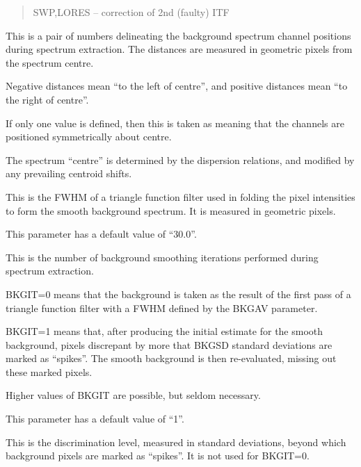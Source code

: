 \begin {description}
\begin {quote}
\begin {description}
\item SWP,LORES -- correction of 2nd (faulty) ITF
\end {description}
\end {quote}

\item [BDIST=(number\{,number\})]
This is a pair of numbers delineating the background spectrum channel
positions during spectrum extraction.
The distances are measured in geometric pixels from the spectrum centre.

Negative distances mean ``to the left of centre'', and positive distances
mean ``to the right of centre''.

If only one value is defined, then this is taken as meaning
that the channels are positioned symmetrically
about centre.

The spectrum ``centre'' is determined by the dispersion relations, and
modified by any prevailing centroid shifts.

\item [BKGAV=number]
This is the FWHM of a triangle function filter used in folding the
pixel intensities to form the smooth background spectrum.
It is measured in geometric pixels.

This parameter has a default value of ``30.0''.

\item [BKGIT=number]
This is the number of background smoothing iterations performed during
spectrum extraction.

\begin {description}
\item BKGIT=0 means that the background is taken as the result of the
first pass of a triangle function filter with a FWHM defined by
the BKGAV parameter.

\item BKGIT=1 means that, after producing the initial estimate for the
smooth background, pixels discrepant by more that BKGSD standard
deviations are marked as ``spikes''.
The smooth background is then re-evaluated, missing out these marked
pixels.
\end {description}

Higher values of BKGIT are possible, but seldom necessary.

This parameter has a default value of ``1''.

\item [BKGSD=number]
This is the discrimination level, measured in standard deviations,
beyond which background pixels are marked as ``spikes''.
It is not used for BKGIT=0.


\end{description}

